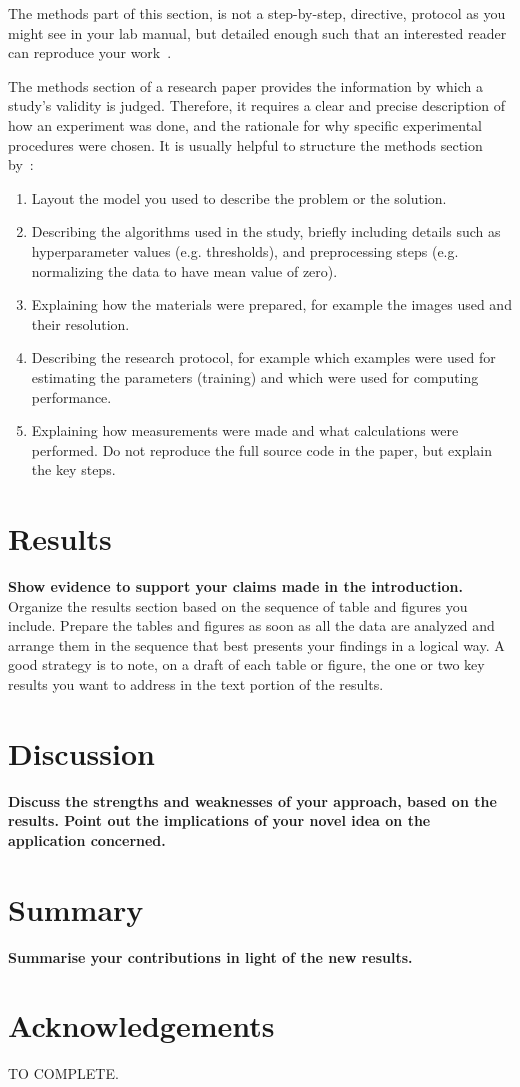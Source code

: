 \documentclass[11pt,conference,compsocconf]{IEEEtran}
\begin{document}
The methods part of this section, is not a step-by-step, directive,
protocol as you might see in your lab manual, but detailed enough such
that an interested reader can reproduce your
work~\cite{anderson04,wavelab}.

The methods section of a research paper provides the information by
which a study's validity is judged.
Therefore, it requires a clear and precise description of how an
experiment was done, and the rationale
for why specific experimental procedures were chosen.
It is usually helpful to
structure the methods section by~\cite{kallet04methods}:
\begin{enumerate}
\item Layout the model you used to describe the problem or the solution.
\item Describing the algorithms used in the study, briefly including
  details such as hyperparameter values (e.g. thresholds), and
  preprocessing steps (e.g. normalizing the data to have mean value of
  zero).
\item Explaining how the materials were prepared, for example the
  images used and their resolution.
\item Describing the research protocol, for example which examples
  were used for estimating the parameters (training) and which were
  used for computing performance.
\item Explaining how measurements were made and what
  calculations were performed. Do not reproduce the full source code in
  the paper, but explain the key steps.
\end{enumerate}
 

\section{Results}\label{sec:results}
\textbf{Show evidence to support your claims made in the
  introduction.}
  Organize the results section based on the sequence of table and
figures you include. Prepare the tables and figures as soon as all
the data are analyzed and arrange them in the sequence that best
presents your findings in a logical way. A good strategy is to note,
on a draft of each table or figure, the one or two key results you
want to address in the text portion of the results.

\section{Discussion}\label{sec:discussion}
  \textbf{Discuss the strengths and weaknesses of your
  approach, based on the results. Point out the implications of your
  novel idea on the application concerned.}
  
\section{Summary}\label{sec:summary}
  \textbf{Summarise your contributions in light of the new
  results.}

\section*{Acknowledgements}
TO COMPLETE.

\newpage


\end{document}
